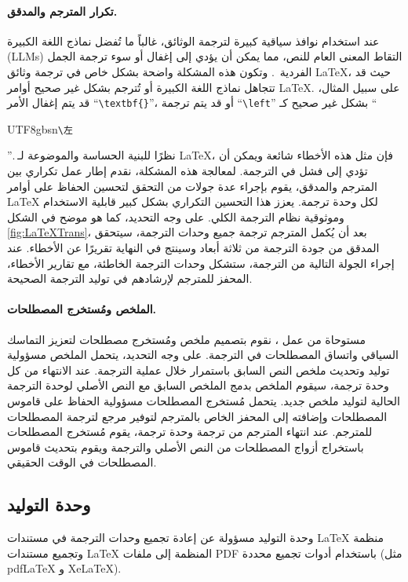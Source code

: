 \documentclass[11pt]{article}
\begin{document}
\paragraph{تكرار المترجم والمدقق.}
عند استخدام نوافذ سياقية كبيرة لترجمة الوثائق، غالباً ما تُفضل نماذج اللغة الكبيرة (LLMs) التقاط المعنى العام للنص، مما يمكن أن يؤدي إلى إغفال أو سوء ترجمة الجمل الفردية~\cite {wang2025deltaonlinedocumentleveltranslation}. وتكون هذه المشكلة واضحة بشكل خاص في ترجمة وثائق LaTeX، حيث قد تتجاهل نماذج اللغة الكبيرة أو تُترجم بشكل غير صحيح أوامر LaTeX. على سبيل المثال، قد يتم إغفال الأمر ``\texttt{\textbackslash textbf\{\}}''، أو قد يتم ترجمة ``\texttt{\textbackslash left}'' بشكل غير صحيح كـ ``\begin{CJK}{UTF8}{gbsn}\texttt{\textbackslash 左}\end{CJK}''.
نظرًا للبنية الحساسة والموضوعة لـ LaTeX، فإن مثل هذه الأخطاء شائعة ويمكن أن تؤدي إلى فشل في الترجمة. لمعالجة هذه المشكلة، نقدم إطار عمل تكراري بين المترجم والمدقق، يقوم بإجراء عدة جولات من التحقق لتحسين الحفاظ على أوامر LaTeX لكل وحدة ترجمة. يعزز هذا التحسين التكراري بشكل كبير قابلية الاستخدام وموثوقية نظام الترجمة الكلي. على وجه التحديد، كما هو موضح في الشكل \ref{fig:LaTeXTrans}، بعد أن يُكمل المترجم ترجمة جميع وحدات الترجمة، سيتحقق المدقق من جودة الترجمة من ثلاثة أبعاد وسينتج في النهاية تقريرًا عن الأخطاء. عند إجراء الجولة التالية من الترجمة، ستشكل وحدات الترجمة الخاطئة، مع تقارير الأخطاء، المحفز للمترجم لإرشادهم في توليد الترجمة الصحيحة.

\paragraph{الملخص ومُستخرج المصطلحات.}
مستوحاة من عمل \citet{wang2025deltaonlinedocumentleveltranslation}، نقوم بتصميم ملخص ومُستخرج مصطلحات لتعزيز التماسك السياقي واتساق المصطلحات في الترجمة. على وجه التحديد، يتحمل الملخص مسؤولية توليد وتحديث ملخص النص السابق باستمرار خلال عملية الترجمة. عند الانتهاء من كل وحدة ترجمة، سيقوم الملخص بدمج الملخص السابق مع النص الأصلي لوحدة الترجمة الحالية لتوليد ملخص جديد. يتحمل مُستخرج المصطلحات مسؤولية الحفاظ على قاموس المصطلحات وإضافته إلى المحفز الخاص بالمترجم لتوفير مرجع لترجمة المصطلحات للمترجم. عند انتهاء المترجم من ترجمة وحدة ترجمة، يقوم مُستخرج المصطلحات باستخراج أزواج المصطلحات من النص الأصلي والترجمة ويقوم بتحديث قاموس المصطلحات في الوقت الحقيقي.
\subsection{وحدة التوليد}
وحدة التوليد مسؤولة عن إعادة تجميع وحدات الترجمة في مستندات LaTeX منظمة وتجميع مستندات LaTeX المنظمة إلى ملفات PDF باستخدام أدوات تجميع محددة (مثل pdf\LaTeX{} و Xe\LaTeX{}).
\end{document}
